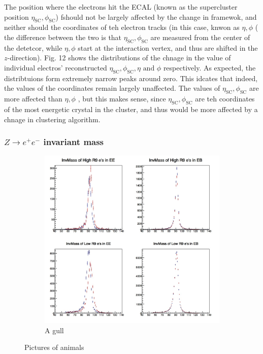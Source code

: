 \documentclass[10pt]{article}
\begin{document}
The position where the electrons hit the ECAL (known as the supercluster position $\eta_{\text{SC}},\phi_{\text{SC}}$) fshould not be largely affected by the change in framewok, and neither should the coordinates of teh electron tracks (in this case, knwon as $\eta,\phi$  ( the difference between the two is that $\eta_{\text{SC}},\phi_{\text{SC}}$ are measured from the center of the detetcor, while $\eta,\phi$ start at the interaction vertex, and thus are shifted in the $z$-direction). Fig. 12 shows the distributions of the chnage in the value of individual electros' reconstructed $\eta_{\text{SC}},\phi_{\text{SC}},\eta \text{ and } \phi$ respectively. As expected, the distribtuions form extremely narrow peaks around zero. This idcates that indeed, the values of the coordinates remain largely unaffected. The values of $\eta_{\text{SC}},\phi_{\text{SC}}$ are more affected than  $\eta,\phi$ , but this makes sense, since $\eta_{\text{SC}},\phi_{\text{SC}}$  are teh coordinates of the most energetic crystal in the cluster, and thus would be more affected by a chnage in clustering algorithm.


\subsubsection{$Z\rightarrow e^+ e^-$ invariant mass }
\begin{figure}[h!]
        \centering
        \begin{subfigure}[b]{0.8\textwidth}
                \includegraphics[width=\textwidth]{Plots/Zee_corr}
                \caption{A gull}
                \label{fig:gull}
        \end{subfigure}%
      
        \caption{Pictures of animals}\label{fig:animals}
\end{figure}
\end{document}
